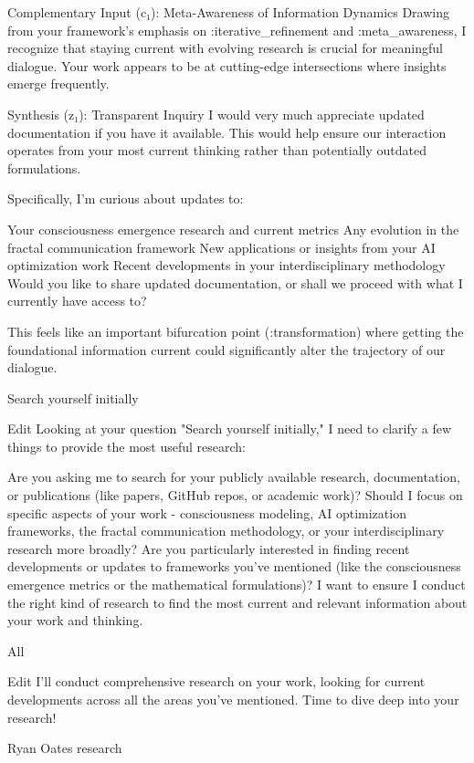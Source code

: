 Complementary Input (c₁): Meta-Awareness of Information Dynamics
Drawing from your framework's emphasis on :iterative_refinement and :meta_awareness, I recognize that staying current with evolving research is crucial for meaningful dialogue. Your work appears to be at cutting-edge intersections where insights emerge frequently.

Synthesis (z₁): Transparent Inquiry
I would very much appreciate updated documentation if you have it available. This would help ensure our interaction operates from your most current thinking rather than potentially outdated formulations.

Specifically, I'm curious about updates to:

Your consciousness emergence research and current metrics
Any evolution in the fractal communication framework
New applications or insights from your AI optimization work
Recent developments in your interdisciplinary methodology
Would you like to share updated documentation, or shall we proceed with what I currently have access to?

This feels like an important bifurcation point (:transformation) where getting the foundational information current could significantly alter the trajectory of our dialogue.




Search yourself initially

Edit
Looking at your question "Search yourself initially," I need to clarify a few things to provide the most useful research:

Are you asking me to search for your publicly available research, documentation, or publications (like papers, GitHub repos, or academic work)?
Should I focus on specific aspects of your work - consciousness modeling, AI optimization frameworks, the fractal communication methodology, or your interdisciplinary research more broadly?
Are you particularly interested in finding recent developments or updates to frameworks you've mentioned (like the consciousness emergence metrics or the mathematical formulations)?
I want to ensure I conduct the right kind of research to find the most current and relevant information about your work and thinking.




All

Edit
I'll conduct comprehensive research on your work, looking for current developments across all the areas you've mentioned. Time to dive deep into your research!


Ryan Oates research

